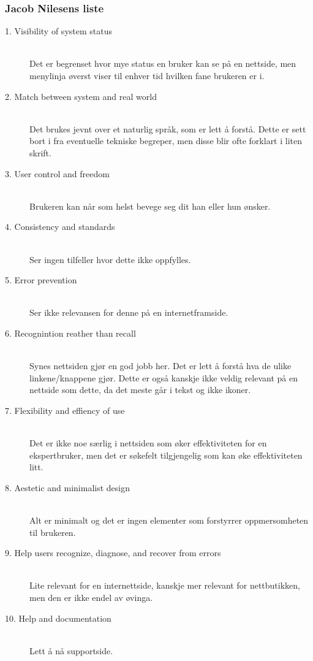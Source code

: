 \subsubsection{Jacob Nilesens liste}

\begin{description}
  \item[1. Visibility of system status] \hfill \\
    Det er begrenset hvor mye status en bruker kan se på en nettside, men menylinja øverst viser til enhver tid hvilken fane brukeren er i.
  \item[2. Match between system and real world] \hfill \\
    Det brukes jevnt over et naturlig språk, som er lett å forstå. Dette er sett bort i fra eventuelle tekniske begreper, men disse blir ofte forklart i liten skrift. 
  \item[3. User control and freedom] \hfill \\
    Brukeren kan når som helst bevege seg dit han eller hun ønsker. 
  \item[4. Consistency and standards] \hfill \\
    Ser ingen tilfeller hvor dette ikke oppfylles. 
  \item[5. Error prevention] \hfill \\
   Ser ikke relevansen for denne på en internetframside. 
  \item[6. Recognintion reather than recall] \hfill \\
  Synes nettsiden gjør en god jobb her. Det er lett å forstå hva de ulike linkene/knappene gjør. Dette er også kanskje ikke veldig relevant på en nettside som dette, da det meste går i tekst og ikke ikoner.
  \item[7. Flexibility and effiency of use] \hfill \\
    Det er ikke noe særlig i nettsiden som øker effektiviteten for en ekspertbruker, men det er søkefelt tilgjengelig som kan øke effektiviteten litt. 
  \item[8. Aestetic and minimalist design] \hfill \\
  Alt er minimalt og det er ingen elementer som forstyrrer oppmersomheten til brukeren. 
  \item[9. Help users recognize, diagnose, and recover from errors] \hfill \\
    Lite relevant for en internettside, kanskje mer relevant for nettbutikken, men den er ikke endel av øvinga.   
  \item[10. Help and documentation] \hfill \\
   Lett å nå supportside.  
\end{description}

